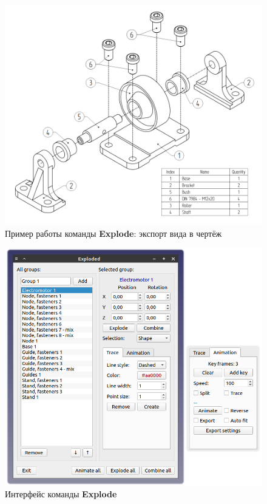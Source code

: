 \documentclass[a4paper,12pt]{article}
\begin{document}
\begin{figure}[htp]
	\centering
	\includegraphics[scale=0.42]{img/exploded_d_result.png}
	\caption{Пример работы команды \textbf{Explode}: экспорт вида в чертёж}
	\label{sec:exploded_d_result}
\end{figure}

\pagebreak


\begin{figure}[htp]
	\centering
	\includegraphics[width=1\textwidth]{img/exploded.png}
	\caption{Интерфейс команды \textbf{Explode}}
	\label{sec:exploded}
\end{figure}
\end{document}
